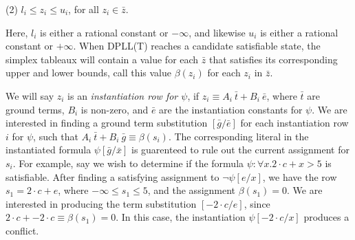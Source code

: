 \documentclass{llncs}
\begin{document}
(2) $l_i \leq z_i \leq u_i$, for all $z_i \in \bar{z}$.

Here, $l_i$ is either a rational constant or $- \infty$, and likewise $u_i$ is either a rational constant or $+ \infty$.
When DPLL(T) reaches a candidate satisfiable state, the simplex tableaux will contain a value for each $\bar{z}$ that satisfies its corresponding upper and lower bounds, call this value $\beta( z_i )$ for each $z_i$ in $\bar{z}$.

We will say $z_i$ is an \emph{instantiation row for $\psi$}, if $z_i \equiv A_i\ \bar{t} + B_i\ \bar{e}$, where $\bar{t}$ are ground terms, $B_i$ is non-zero, and $\bar{e}$ are the instantiation constants for $\psi$.
We are interested in finding a ground term substitution $[\bar{g}/\bar{e}]$ for each instantiation row $i$ for $\psi$, such that $A_i\ \bar{t} + B_i\ \bar{g} \equiv \beta( s_i )$.
The corresponding literal in the instantiated formula $\psi[\bar{g}/\bar{x}]$ is guarenteed to rule out the current assignment for $s_i$.
For example, say we wish to determine if the formula $\psi : \forall x. 2 \cdot c + x > 5$ is satisfiable.
After finding a satisfying assignment to $\neg \psi[e/x]$, we have the row $s_1 = 2 \cdot c + e$, where $- \infty \leq s_1 \leq 5$, and the assignment $\beta( s_1 ) = 0$.
We are interested in producing the term substitution $[-2 \cdot c/e]$, since $2 \cdot c + -2 \cdot c \equiv \beta( s_1 ) = 0$.
In this case, the instantiation $\psi[-2 \cdot c/x]$ produces a conflict.
\end{document}
